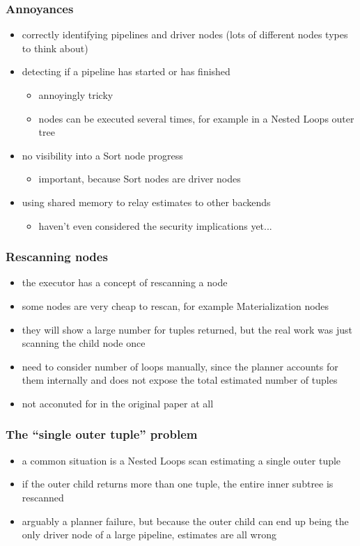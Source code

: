 \documentclass{beamer}
\begin{document}
\begin{frame}
  \frametitle{Annoyances}

  \begin{itemize}
  \item correctly identifying pipelines and driver nodes (lots of different
    nodes types to think about)
  \item detecting if a pipeline has started or has finished
    \begin{itemize}
    \item annoyingly tricky
    \item nodes can be executed several times, for example in a Nested Loops
      outer tree
    \end{itemize}
  \item no visibility into a Sort node progress
    \begin{itemize}
    \item important, because Sort nodes are driver nodes
    \end{itemize}
  \item using shared memory to relay estimates to other backends
    \begin{itemize}
    \item haven't even considered the security implications yet...
    \end{itemize}
  \end{itemize}
\end{frame}

\begin{frame}
  \frametitle{Rescanning nodes}

  \begin{itemize}
  \item the executor has a concept of rescanning a node
  \item some nodes are very cheap to rescan, for example Materialization nodes
  \item they will show a large number for tuples returned, but the real work
    was just scanning the child node once
  \item need to consider number of loops manually, since the planner accounts
    for them internally and does not expose the total estimated number of
    tuples
  \item not acconuted for in the original paper at all
  \end{itemize}
\end{frame}

\begin{frame}
  \frametitle{The ``single outer tuple'' problem}

  \begin{itemize}
  \item a common situation is a Nested Loops scan estimating a single outer
    tuple
  \item if the outer child returns more than one tuple, the entire inner
    subtree is rescanned
  \item arguably a planner failure, but because the outer child can end up
    being the only driver node of a large pipeline, estimates are all wrong
  \end{itemize}
\end{frame}
\end{document}
